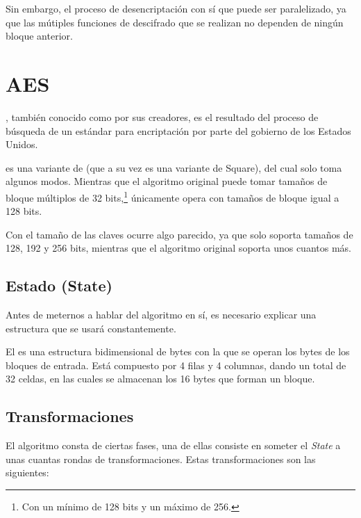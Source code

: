 Sin embargo, el proceso de desencriptación con  sí que puede ser paralelizado,
ya que las mútiples funciones de descifrado que se realizan no dependen de ningún bloque anterior. \emph{\parencite{Reference24}}


\section{AES}

\label{AES}

, también conocido como  por sus creadores,
es el resultado del proceso de búsqueda de un estándar para encriptación por parte del gobierno de los Estados Unidos.

 es una variante de  (que a su vez es una variante de Square), del cual solo toma algunos modos.
Mientras que el algoritmo original puede tomar tamaños de bloque múltiplos de 32 bits,\footnote{Con un mínimo de 128 bits y un máximo de 256.}
 únicamente opera con tamaños de bloque igual a 128 bits.

Con el tamaño de las claves ocurre algo parecido, ya que  solo soporta tamaños de 128, 192 y 256 bits,
mientras que el algoritmo original soporta unos cuantos más. \emph{\parencite{Reference25}}

\subsection{Estado (State)}

Antes de meternos a hablar del algoritmo en sí, es necesario explicar una estructura que se usará
constantemente.

El  es una estructura bidimensional de bytes con la que se operan los bytes
de los bloques de entrada. Está compuesto por 4 filas y 4 columnas, dando un total de 32 celdas,
en las cuales se almacenan los 16 bytes que forman un bloque. \emph{\parencite{Reference26}}

\subsection{Transformaciones}

El algoritmo consta de ciertas fases, una de ellas consiste en someter el \emph{State}
a unas cuantas rondas de transformaciones. Estas transformaciones son las siguientes:

